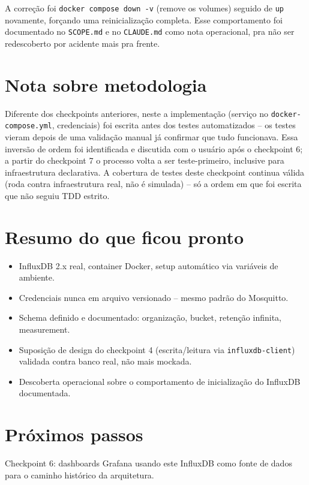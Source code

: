 \documentclass[11pt,a4paper]{article}
\begin{document}
A correção foi \texttt{docker compose down -v} (remove os volumes) seguido de \texttt{up} novamente, forçando uma reinicialização completa. Esse comportamento foi documentado no \texttt{SCOPE.md} e no \texttt{CLAUDE.md} como nota operacional, pra não ser redescoberto por acidente mais pra frente.

\section{Nota sobre metodologia}

Diferente dos checkpoints anteriores, neste a implementação (serviço no \texttt{docker-compose.yml}, credenciais) foi escrita antes dos testes automatizados -- os testes vieram depois de uma validação manual já confirmar que tudo funcionava. Essa inversão de ordem foi identificada e discutida com o usuário após o checkpoint 6; a partir do checkpoint 7 o processo volta a ser teste-primeiro, inclusive para infraestrutura declarativa. A cobertura de testes deste checkpoint continua válida (roda contra infraestrutura real, não é simulada) -- só a ordem em que foi escrita que não seguiu TDD estrito.

\section{Resumo do que ficou pronto}

\begin{itemize}
    \item InfluxDB 2.x real, container Docker, setup automático via variáveis de ambiente.
    \item Credenciais nunca em arquivo versionado -- mesmo padrão do Mosquitto.
    \item Schema definido e documentado: organização, bucket, retenção infinita, measurement.
    \item Suposição de design do checkpoint 4 (escrita/leitura via \texttt{influxdb-client}) validada contra banco real, não mais mockada.
    \item Descoberta operacional sobre o comportamento de inicialização do InfluxDB documentada.
\end{itemize}

\section{Próximos passos}

Checkpoint 6: dashboards Grafana usando este InfluxDB como fonte de dados para o caminho histórico da arquitetura.
\end{document}
